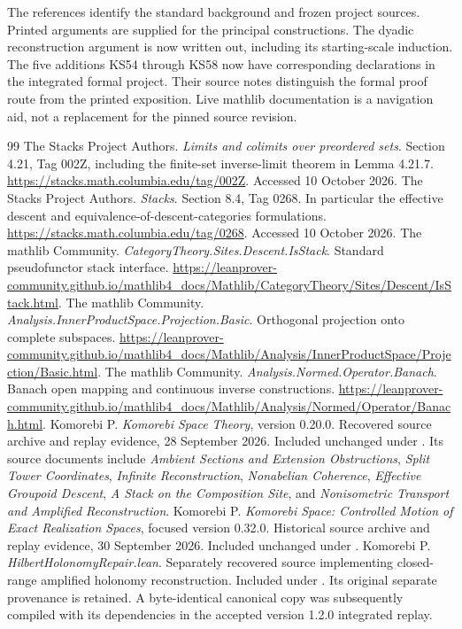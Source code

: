 \clearpage
{}\label{app:references}
The references identify the standard background and frozen project sources. Printed arguments are supplied for the principal constructions. The dyadic reconstruction argument is now written out, including its starting-scale induction. The five additions KS54 through KS58 now have corresponding declarations in the integrated formal project. Their source notes distinguish the formal proof route from the printed exposition. Live mathlib documentation is a navigation aid, not a replacement for the pinned source revision.

\begin{thebibliography}{99}
 The Stacks Project Authors. \emph{Limits and colimits over preordered sets}. Section 4.21, Tag 002Z, including the finite-set inverse-limit theorem in Lemma 4.21.7. \url{https://stacks.math.columbia.edu/tag/002Z}. Accessed 10 October 2026.
 The Stacks Project Authors. \emph{Stacks}. Section 8.4, Tag 0268. In particular the effective descent and equivalence-of-descent-categories formulations. \url{https://stacks.math.columbia.edu/tag/0268}. Accessed 10 October 2026.
 The mathlib Community. \emph{CategoryTheory.Sites.Descent.IsStack}. Standard pseudofunctor stack interface. \url{https://leanprover-community.github.io/mathlib4_docs/Mathlib/CategoryTheory/Sites/Descent/IsStack.html}.
 The mathlib Community. \emph{Analysis.InnerProductSpace.Projection.Basic}. Orthogonal projection onto complete subspaces. \url{https://leanprover-community.github.io/mathlib4_docs/Mathlib/Analysis/InnerProductSpace/Projection/Basic.html}.
 The mathlib Community. \emph{Analysis.Normed.Operator.Banach}. Banach open mapping and continuous inverse constructions. \url{https://leanprover-community.github.io/mathlib4_docs/Mathlib/Analysis/Normed/Operator/Banach.html}.
 Komorebi P. \emph{Komorebi Space Theory}, version 0.20.0. Recovered source archive and replay evidence, 28 September 2026. Included unchanged under . Its source documents include \emph{Ambient Sections and Extension Obstructions}, \emph{Split Tower Coordinates}, \emph{Infinite Reconstruction}, \emph{Nonabelian Coherence}, \emph{Effective Groupoid Descent}, \emph{A Stack on the Composition Site}, and \emph{Nonisometric Transport and Amplified Reconstruction}.
 Komorebi P. \emph{Komorebi Space: Controlled Motion of Exact Realization Spaces}, focused version 0.32.0. Historical source archive and replay evidence, 30 September 2026. Included unchanged under .
 Komorebi P. \emph{HilbertHolonomyRepair.lean}. Separately recovered source implementing closed-range amplified holonomy reconstruction. Included under . Its original separate provenance is retained. A byte-identical canonical copy was subsequently compiled with its dependencies in the accepted version 1.2.0 integrated replay.
\end{thebibliography}

